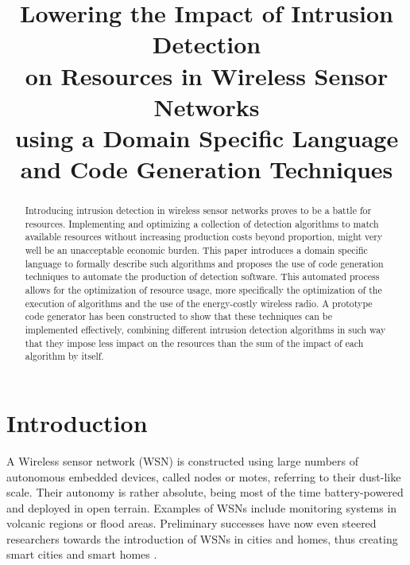 \documentclass[conference]{IEEEtran}
\begin{document}
\expandafter\def\csname PY@tok@err\endcsname{}

\title{Lowering the Impact of Intrusion Detection\\
on Resources in Wireless Sensor Networks\\
using a Domain Specific Language\\
and Code Generation Techniques}

\author{%
}

\maketitle

\begin{abstract}
  
Introducing intrusion detection in wireless sensor networks proves to be a
battle for resources. Implementing and optimizing a collection of detection
algorithms to match available resources without increasing production costs
beyond proportion, might very well be an unacceptable economic burden. This
paper introduces a domain specific language to formally describe such
algorithms and proposes the use of code generation techniques to automate the
production of detection software. This automated process allows for the
optimization of resource usage, more specifically the optimization of the
execution of algorithms and the use of the energy-costly wireless radio. A
prototype code generator has been constructed to show that these techniques can
be implemented effectively, combining different intrusion detection algorithms
in such way that they impose less impact on the resources than the sum of the
impact of each algorithm by itself.

\end{abstract}

\section{Introduction}

A Wireless sensor network (WSN) is constructed using large numbers of
autonomous embedded devices, called nodes or motes, referring to their
dust-like scale. Their autonomy is rather absolute, being most of the time
battery-powered and deployed in open terrain. Examples of WSNs include
monitoring systems in volcanic regions or flood areas. Preliminary successes
have now even steered researchers towards the introduction of WSNs in cities
and homes, thus creating smart cities \cite{schaffers2011smart} and smart homes
\cite{chan2008review}.
\end{document}
